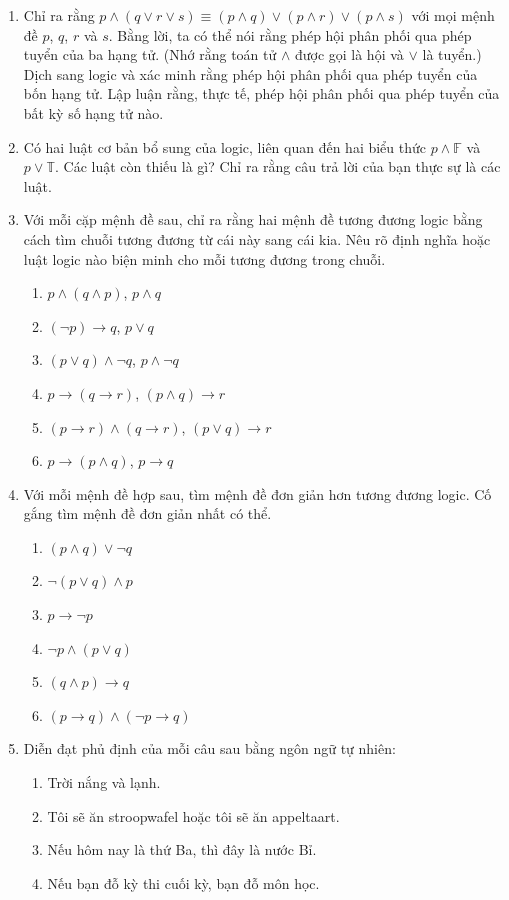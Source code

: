 \begin{enumerate}
\item[7.] Chỉ ra rằng $p \land (q \lor r \lor s) \equiv (p \land q) \lor (p \land r) \lor (p \land s)$ với mọi mệnh đề $p$, $q$, $r$ và $s$. Bằng lời, ta có thể nói rằng phép hội phân phối qua phép tuyển của ba hạng tử. (Nhớ rằng toán tử $\land$ được gọi là hội và $\lor$ là tuyển.) Dịch sang logic và xác minh rằng phép hội phân phối qua phép tuyển của bốn hạng tử. Lập luận rằng, thực tế, phép hội phân phối qua phép tuyển của bất kỳ số hạng tử nào.

\item[8.] Có hai luật cơ bản bổ sung của logic, liên quan đến hai biểu thức $p \land \mathbb{F}$ và $p \lor \mathbb{T}$. Các luật còn thiếu là gì? Chỉ ra rằng câu trả lời của bạn thực sự là các luật.

\item[9.] Với mỗi cặp mệnh đề sau, chỉ ra rằng hai mệnh đề tương đương logic bằng cách tìm chuỗi tương đương từ cái này sang cái kia. Nêu rõ định nghĩa hoặc luật logic nào biện minh cho mỗi tương đương trong chuỗi.
\begin{enumerate}[label=\alph*)]
\item $p \land (q \land p)$, \quad $p \land q$
\item $(\lnot p) \to q$, \quad $p \lor q$
\item $(p \lor q) \land \lnot q$, \quad $p \land \lnot q$
\item $p \to (q \to r)$, \quad $(p \land q) \to r$
\item $(p \to r) \land (q \to r)$, \quad $(p \lor q) \to r$
\item $p \to (p \land q)$, \quad $p \to q$
\end{enumerate}

\item[$\dagger$10.] Với mỗi mệnh đề hợp sau, tìm mệnh đề đơn giản hơn tương đương logic. Cố gắng tìm mệnh đề đơn giản nhất có thể.
\begin{enumerate}[label=\alph*)]
\item $(p \land q) \lor \lnot q$
\item $\lnot(p \lor q) \land p$
\item $p \to \lnot p$
\item $\lnot p \land (p \lor q)$
\item $(q \land p) \to q$
\item $(p \to q) \land (\lnot p \to q)$
\end{enumerate}

\item[$\dagger$11.] Diễn đạt phủ định của mỗi câu sau bằng ngôn ngữ tự nhiên:
\begin{enumerate}[label=\alph*)]
\item Trời nắng và lạnh.
\item Tôi sẽ ăn stroopwafel hoặc tôi sẽ ăn appeltaart.
\item Nếu hôm nay là thứ Ba, thì đây là nước Bỉ.
\item Nếu bạn đỗ kỳ thi cuối kỳ, bạn đỗ môn học.
\end{enumerate}


\end{enumerate}

